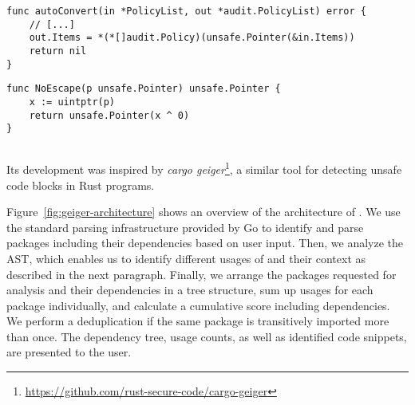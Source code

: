 \begin{lstlisting}[language=Golang, label=lst:unsafe-ex-in-place-cast, caption=In-place cast using the \unsafe{} package
from the Kubernetes \textit{k8s.io/apiserver} module with minor changes.
,float, belowskip=-1.5em, aboveskip=0em]
func autoConvert(in *PolicyList, out *audit.PolicyList) error {
	// [...]
	out.Items = *(*[]audit.Policy)(unsafe.Pointer(&in.Items))
	return nil
}
\end{lstlisting}

\begin{lstlisting}[language=Golang, label=lst:unsafe-ex-escape-analysis, caption=Hiding a value from escape analysis from the \textit{modern-go/reflect2} module.
, float, belowskip=-1.5em]
func NoEscape(p unsafe.Pointer) unsafe.Pointer {
	x := uintptr(p)
	return unsafe.Pointer(x ^ 0)
}
\end{lstlisting}

\subsection{}
\label{sec:appr:toolUsage}

Its development was inspired by \textit{cargo geiger}\footnote{\url{https://github.com/rust-secure-code/cargo-geiger}}, a similar tool for detecting unsafe code blocks in Rust programs.


Figure~\ref{fig:geiger-architecture} shows an overview of the architecture of \toolUsage{}.
We use the standard parsing infrastructure provided by Go to identify and parse packages including their dependencies based on user input.
Then, we analyze the AST, %
which enables us to identify different usages of \unsafe{} and their context as described in the next paragraph.
Finally, we arrange the packages requested for analysis and their dependencies in a tree structure, sum up \unsafe{} usages for each package individually, and calculate a cumulative score including dependencies.
We perform a deduplication if the same package is transitively imported more than once.
The \unsafe{} dependency tree, usage counts, as well as identified code snippets, are presented to the user.


